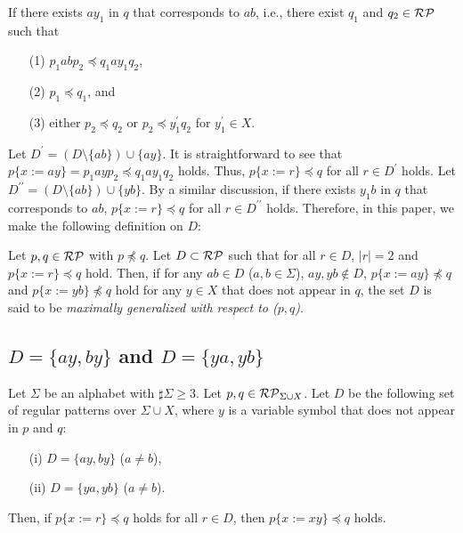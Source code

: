 \noindent
If there exists $ay_{1}$ in $q$ that corresponds to $ab$, i.e., there exist $q_{1}$ and $q_{2}\in \mathcal{RP}$ such that
  \begin{enumerate}
  \item[(1)] $p_{1}abp_{2} \preceq q_{1}ay_{1}q_{2}$, 
  \item[(2)] $p_{1} \preceq q_{1}$, and
  \item[(3)] either $p_{2} \preceq q_{2}$ or $p_{2} \preceq y_{1}^{\prime}q_{2}$ for $y_{1}^{\prime}\in X$.
  \end{enumerate}
Let $D^{\prime} = (D \setminus \{ab\}) \cup \{ay\}$.
It is straightforward to see that $p\{x:=ay\} = p_{1}ayp_{2} \preceq q_{1}ay_{1}q_{2}$ holds.
Thus, $p \{ x := r \} \preceq q$ for all $r \in D^{\prime}$ holds.
Let $D^{\prime\prime} = (D \setminus \{ab\}) \cup \{yb\}$.
By a similar discussion, if there exists $y_{1}b$ in $q$ that corresponds to $ab$, $p \{ x := r \} \preceq q$ for all $r \in D^{\prime\prime}$ holds.
Therefore, in this paper, we make the following definition on $D$:

\smallskip

\begin{dfn}
Let $p,q \in \mathcal{RP}$ {\color{red} with $p\not\preceq q$}.
Let $D \subset \mathcal{RP}$ such that for all $r\in D$, $|r| = 2$ and $p \{ x := r \} \preceq q$ hold.
Then, if for any $ab\in D$ ($a,b\in\Sigma$), {\color{red} $ay,yb\not\in D$}, $p \{ x := ay \} \not\preceq q$ and $p \{ x := yb \} \not\preceq q$ hold for any $y \in X$ that does not appear in $q$, the set $D$ is said to be \textit{maximally generalized {\color{red}with respect to} ($p,q$)}.
\end{dfn}



\subsection{$D=\{ ay, by \}$ and $D=\{ ya, yb \}$}\label{subsec:d2}

\begin{lem}\label{lem:twovariables}
Let $\Sigma$ be an alphabet with $\sharp\Sigma \ge 3$.
Let $p,q \in \mathcal{RP}_{\Sigma\cup X}$.
Let $D$ be the following set of regular patterns {\color{red}over} $\Sigma\cup X$, where $y$ is a variable symbol that does not appear in $p$ and $q$:
\begin{enumerate}
\item[{\rm (i)}] $D=\{ ay, by \}$ ($a \not= b$),
\item[{\rm (ii)}] $D=\{ ya, yb \}$ ($a \not= b$).
\end{enumerate}
Then, if $p \{ x := r \} \preceq q$ holds for all $r \in D$, then $p \{ x := xy \} \preceq q$ holds.
\end{lem}

